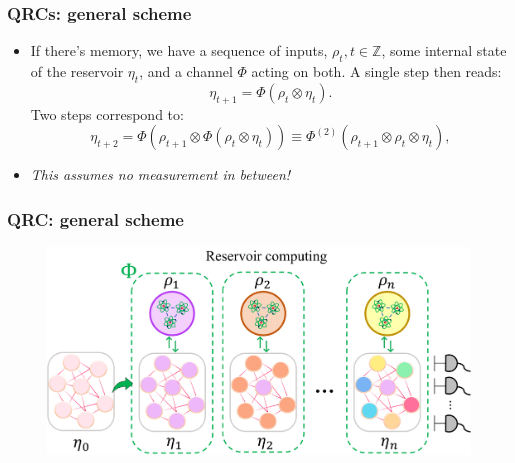 \documentclass{beamer}
\begin{document}
\begin{frame}
\frametitle{QRCs: general scheme}
\begin{itemize}
    \item If there's memory, we have a sequence of inputs, $\rho_t, t\in\mathbb{Z}$, some internal state of the reservoir $\eta_t$, and a channel $\Phi$ acting on both. A single step then reads:
    \begin{equation}
        \eta_{t+1} = \Phi(\rho_t\otimes\eta_t).
    \end{equation}
    Two steps correspond to:
    \begin{equation}
        \eta_{t+2} = \Phi(\rho_{t+1}\otimes\Phi(\rho_t\otimes\eta_t))
        \equiv \Phi^{(2)}(\rho_{t+1}\otimes\rho_t\otimes\eta_t),
    \end{equation}
    
    \item \textit{This assumes no measurement in between!}
\end{itemize}
\end{frame}


\begin{frame}
\frametitle{QRC: general scheme}

\begin{figure}
\includegraphics[width=\linewidth]{figures/scheme_QRC.png}
\end{figure}

\end{frame}



\end{document}

